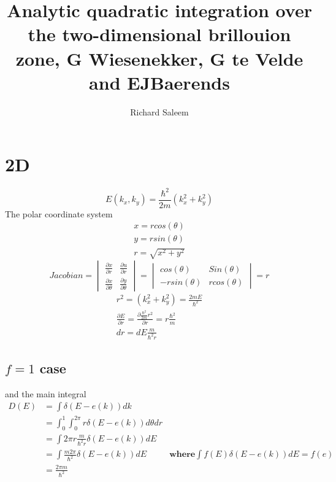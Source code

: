 \documentclass[11pt,a4paper]{article}
\author{Richard Saleem}
\title{Analytic quadratic integration over the two-dimensional brillouion zone, G Wiesenekker, G te Velde and EJBaerends}
\begin{document}
\maketitle
\newpage
\tableofcontents
\newpage




\section{2D}
\begin{equation}
E(k_x , k_y) = \frac{\hbar^2}{2m} (k_x^2+k_y^2)
\end{equation}
The polar coordinate system  
\begin{align}
x = r cos(\theta)\\
y = r sin (\theta)\\
r = \sqrt{x^2 + y ^2}
\end{align}
\[
Jacobian = 
  \begin{vmatrix}
   \frac{\partial x}{\partial r}  &  \frac{\partial u}{\partial r} \\
   \frac{\partial x }{\partial \theta} & \frac{\partial y}{\partial \theta}
  \end{vmatrix}
 =    \begin{vmatrix}
   cos(\theta)  &  Sin(\theta) \\
   -rsin(\theta) & rcos(\theta)
  \end{vmatrix}
  = r\]
\begin{align}
r^2= (k_x^2+k_y^2) = \frac{2m E}{\hbar^2} \label{r^2}\\
\frac{\partial E}{\partial r} = \frac{\partial \frac{\hbar^2}{2m} r^2 }{\partial r} = r \frac{\hbar^2}{m}\\
dr = dE \frac{m}{\hbar^2 r}
\end{align}
\subsection{$f = 1$ case}
and the main integral
\begin{align}
D(E) &= \int \delta(E-e(k))dk \\
&= \int_0^1 \int_0^{2\pi}r\delta(E-e(k))d\theta dr\\
&= \int 2\pi r \frac{m}{\hbar^2 r}\delta(E-e(k))dE\\ 
&= \int \frac{m 2\pi}{\hbar ^2}\delta(E-e(k))dE & \textbf{where} \int f(E) \delta(E-e(k))dE  = f(e) \\
&= \frac{2\pi m}{\hbar^2}
\end{align}
\end{document}
